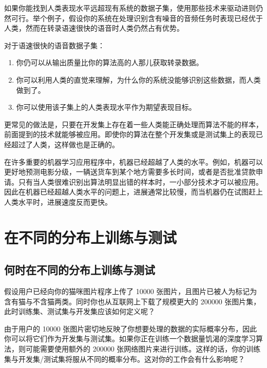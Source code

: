 如果你能找到人类表现水平远超现有系统的数据子集，使用那些技术来驱动进则仍然可行。举个例子，假设你的系统在处理识别含有噪音的音频任务时表现已经优于人类，然而在转录语速很快的语音时人类仍然占有优势。

对于语速很快的语音数据子集：

\begin{enumerate}
\def\labelenumi{\arabic{enumi}.}
\tightlist
\item
  你仍可以从输出质量比你的算法高的人那儿获取转录数据。
\item
  你可以利用人类的直觉来理解，为什么你的系统没能够识别这些数据，而人类做到了。
\item
  你可以使用该子集上的人类表现水平作为期望表现目标。
\end{enumerate}

更常见的做法是，只要在开发集上存在着一些人类能正确处理而算法不能的样本，前面提到的技术就能够被应用。即使你的算法在整个开发集或是测试集上的表现已经超过了人类，这样做也是正确的。

在许多重要的机器学习应用程序中，机器已经超越了人类的水平。例如，机器可以更好地预测电影分级，一辆送货车到某个地方需要多长时间，或者是否批准贷款申请。只有当人类很难识别出算法明显出错的样本时，一小部分技术才可以被应用。因此在机器已经超越人类水平的问题上，进展通常比较慢，而当机器仍在试图赶上人类水平时，进展速度反而更快。

\hypertarget{ux5728ux4e0dux540cux7684ux5206ux5e03ux4e0aux8badux7ec3ux4e0eux6d4bux8bd5}{%
\part{在不同的分布上训练与测试}\label{ux5728ux4e0dux540cux7684ux5206ux5e03ux4e0aux8badux7ec3ux4e0eux6d4bux8bd5}}

\hypertarget{ux4f55ux65f6ux5728ux4e0dux540cux7684ux5206ux5e03ux4e0aux8badux7ec3ux4e0eux6d4bux8bd5}{%
\chapter{何时在不同的分布上训练与测试}\label{ux4f55ux65f6ux5728ux4e0dux540cux7684ux5206ux5e03ux4e0aux8badux7ec3ux4e0eux6d4bux8bd5}}

假设用户已经向你的猫咪图片程序上传了 10000
张图片，且图片已被人为标记为含有猫与不含猫两类。同时你也从互联网上下载了规模更大的
200000 张图片集，此时训练集、测试集与开发集应该如何定义呢？

由于用户的 10000
张图片密切地反映了你想要处理的数据的实际概率分布，因此你可以将它们作为开发集与测试集。如果你正在训练一个数据量饥渴的深度学习算法，则可能需要使用额外的
200000
张网络图片来进行训练。这样的话，你的训练集与开发集/测试集将服从不同的概率分布。这对你的工作会有什么影响呢？

